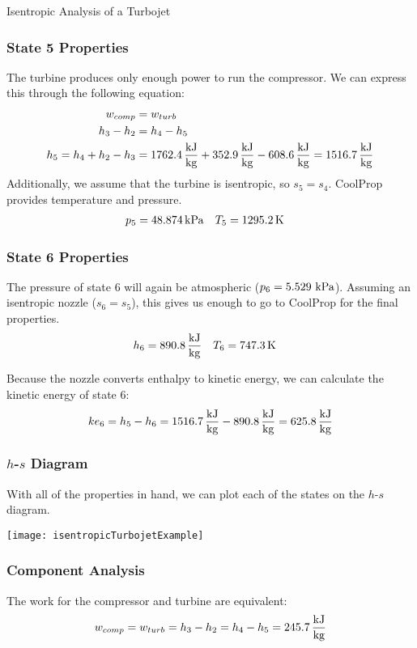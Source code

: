 \begin{example}[label=ex:turbojetIsentropic]{Isentropic Analysis of a Turbojet}
  \subsubsection*{State 5 Properties}
  The turbine produces only enough power to run the compressor.  We can express this through the following equation:
  \begin{align*}
    w_{comp} &= w_{turb} \\
    h_3 - h_2 &= h_4 - h_5 \\
    h_5 = h_4 + h_2 - h_3 &= 1762.4\, \frac{\rm kJ}{\rm kg} + 352.9\, \frac{\rm kJ}{\rm kg} - 608.6\, \frac{\rm kJ}{\rm kg} = 1516.7\, \frac{\rm kJ}{\rm kg}
  \end{align*}
  Additionally, we assume that the turbine is isentropic, so $s_5 = s_4$.  CoolProp provides temperature and pressure.
  \begin{align*}
    p_5 &= 48.874 {\rm\, kPa} & T_5 &= 1295.2 {\rm\, K} 
  \end{align*}

  \subsubsection*{State 6 Properties}
  The pressure of state 6 will again be atmospheric ($p_6 = 5.529 {\rm\ kPa}$).  Assuming an isentropic nozzle ($s_6 = s_5$), this gives us enough to go to CoolProp for the final properties.
  \begin{align*}
    h_6 &= 890.8\, \frac{\rm kJ}{\rm kg} &  T_6 &= 747.3 {\rm\, K}
  \end{align*}

  Because the nozzle converts enthalpy to kinetic energy, we can calculate the kinetic energy of state 6:
  \begin{equation*}
    ke_6 = h_5 - h_6 = 1516.7\, \frac{\rm kJ}{\rm kg} - 890.8\, \frac{\rm kJ}{\rm kg} = 625.8\, \frac{\rm kJ}{\rm kg}
  \end{equation*}

  \subsubsection*{$h$-$s$ Diagram}
  With all of the properties in hand, we can plot each of the states on the $h$-$s$ diagram.
  \begin{center}
    \texttt{[image: isentropicTurbojetExample]}
  \end{center}
  \subsubsection*{Component Analysis}
  The work for the compressor and turbine are equivalent:
  \begin{equation*}
    w_{comp} = w_{turb} = h_3 - h_2 = h_4 - h_5 = 245.7\, \frac{\rm kJ}{\rm kg}
  \end{equation*}


\end{example}
